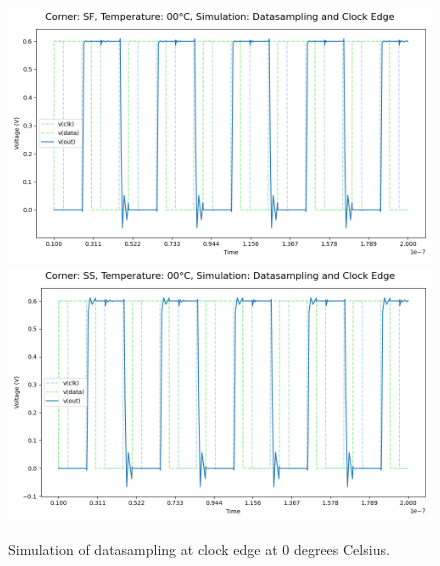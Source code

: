 \begin{figure}[H]
    \vspace{5pt}
    \includegraphics[height= 0.21\textheight]{figures/aimspice/0.600_0.1u_0.1u_0.3u_0.1u/functionality/SF00W1.png}
    \vspace{5pt}
    \includegraphics[height= 0.21\textheight]{figures/aimspice/0.600_0.1u_0.1u_0.3u_0.1u/functionality/SS00W1.png}
    \caption{Simulation of datasampling at clock edge at 0 degrees Celsius.}
    \label{fig:aimspice_W1_0}
\end{figure}

\pagebreak

